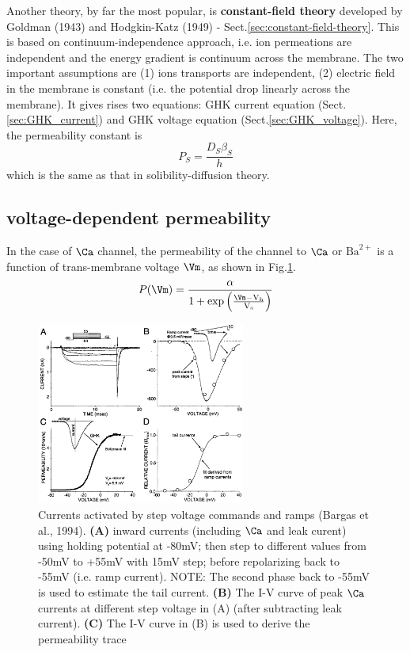 Another theory, by far the most popular, is {\bf constant-field theory}
developed by Goldman (1943) and Hodgkin-Katz (1949) -
Sect.\ref{sec:constant-field-theory}. This is based on continuum-independence
approach, i.e. ion permeations are independent and the energy gradient is
continuum across the membrane.
The two important assumptions are (1) ions transports are independent, (2)
electric field in the membrane is constant (i.e. the potential drop linearly
across the membrane).  It gives rises two equations: GHK current equation
(Sect.\ref{sec:GHK_current}) and GHK voltage equation
(Sect.\ref{sec:GHK_voltage}). Here, the permeability constant is
\begin{equation}
P_S = \frac{D_S\beta_S}{h}
\end{equation}
which is the same as that in solibility-diffusion theory.

\subsection{voltage-dependent permeability}
\label{sec:permeability-Voltage-dependence}

\def\Ba{{\text{Ba}^{2+}}}
\def\Vhalf{{\text{V}_{\text{h}}}}
\def\Vslope{{\text{V}_{\text{s}}}}

In the case of $\Ca$ channel, the permeability of the channel to $\Ca$ or $\Ba$
is a function of trans-membrane voltage $\Vm$, as shown in
Fig.\ref{fig:Ca2+-current-voltage-clamp-Bargas-1994-MSN}.
\begin{equation}
P(\Vm) = \frac{\alpha}{1 + \exp\left( \frac{\Vm - \Vhalf}{\Vslope}  \right)}
\end{equation}

\begin{figure}[hbt]
  \centerline{\includegraphics[height=6cm,
    angle=0]{./images/Ca2+-current-voltage-clamp-Bargas-1994-MSN.eps}}
  \caption{Currents activated by step voltage commands and ramps (Bargas et
  al., 1994).
  {\bf (A)} inward currents (including $\Ca$ and leak curent) using holding potential at -80mV;
  then step to different values from -50mV to +55mV with 15mV step; before
  repolarizing back to -55mV (i.e. ramp current). NOTE: The second phase back to
  -55mV is used to estimate the tail current. {\bf (B)} The I-V curve of peak $\Ca$ currents at
  different step voltage in (A) (after
  subtracting leak current). {\bf (C)} The I-V curve in (B) is used to derive
  the permeability trace }
\label{fig:Ca2+-current-voltage-clamp-Bargas-1994-MSN}
\end{figure}


